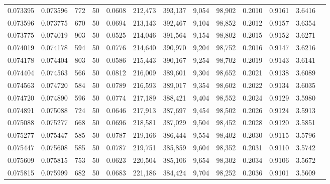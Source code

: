 \begin{tabular}{rrrrrrrrrrrrr}
0.073395 & 0.073596 &   772 &  50 &                                     0.0608 & 212,473 & 393,137 &   9,054 &  98,902 & 0.2010 & 0.9161 & 3.6416 \\
0.073596 & 0.073775 &   670 &  50 &                                     0.0694 & 213,143 & 392,467 &   9,104 &  98,852 & 0.2012 & 0.9157 & 3.6354 \\
0.073775 & 0.074019 &   903 &  50 &                                     0.0525 & 214,046 & 391,564 &   9,154 &  98,802 & 0.2015 & 0.9152 & 3.6271 \\
0.074019 & 0.074178 &   594 &  50 &                                     0.0776 & 214,640 & 390,970 &   9,204 &  98,752 & 0.2016 & 0.9147 & 3.6216 \\
0.074178 & 0.074404 &   803 &  50 &                                     0.0586 & 215,443 & 390,167 &   9,254 &  98,702 & 0.2019 & 0.9143 & 3.6141 \\
0.074404 & 0.074563 &   566 &  50 &                                     0.0812 & 216,009 & 389,601 &   9,304 &  98,652 & 0.2021 & 0.9138 & 3.6089 \\
0.074563 & 0.074720 &   584 &  50 &                                     0.0789 & 216,593 & 389,017 &   9,354 &  98,602 & 0.2022 & 0.9134 & 3.6035 \\
0.074720 & 0.074890 &   596 &  50 &                                     0.0774 & 217,189 & 388,421 &   9,404 &  98,552 & 0.2024 & 0.9129 & 3.5980 \\
0.074891 & 0.075088 &   724 &  50 &                                     0.0646 & 217,913 & 387,697 &   9,454 &  98,502 & 0.2026 & 0.9124 & 3.5913 \\
0.075088 & 0.075277 &   668 &  50 &                                     0.0696 & 218,581 & 387,029 &   9,504 &  98,452 & 0.2028 & 0.9120 & 3.5851 \\
0.075277 & 0.075447 &   585 &  50 &                                     0.0787 & 219,166 & 386,444 &   9,554 &  98,402 & 0.2030 & 0.9115 & 3.5796 \\
0.075447 & 0.075608 &   585 &  50 &                                     0.0787 & 219,751 & 385,859 &   9,604 &  98,352 & 0.2031 & 0.9110 & 3.5742 \\
0.075609 & 0.075815 &   753 &  50 &                                     0.0623 & 220,504 & 385,106 &   9,654 &  98,302 & 0.2034 & 0.9106 & 3.5672 \\
0.075815 & 0.075999 &   682 &  50 &                                     0.0683 & 221,186 & 384,424 &   9,704 &  98,252 & 0.2036 & 0.9101 & 3.5609 \\

\end{tabular}
